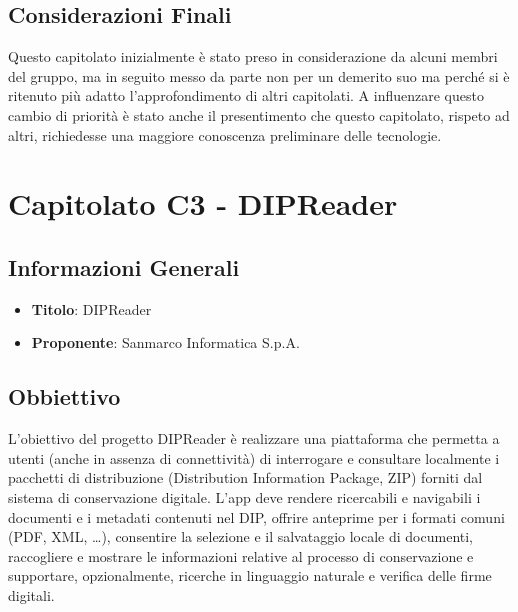 \documentclass[a4paper,12pt]{article}
\begin{document}
    \subsection{Considerazioni Finali}
    Questo capitolato inizialmente è stato preso in considerazione da alcuni membri del gruppo, ma in seguito messo da parte non per un demerito suo ma perché si è ritenuto più adatto l'approfondimento di altri capitolati. A influenzare questo cambio di priorità è stato anche il presentimento che questo capitolato, rispeto ad altri, richiedesse una maggiore conoscenza preliminare delle tecnologie.

    \section{Capitolato C3 - DIPReader} \label{sec:C3}
    \subsection{Informazioni Generali}
        \begin{itemize}
            \item \textbf{Titolo}: DIPReader
            \item \textbf{Proponente}: Sanmarco Informatica S.p.A.
        \end{itemize}
    \subsection{Obbiettivo}
    L’obiettivo del progetto DIPReader è realizzare una piattaforma che permetta a utenti (anche in assenza di connettività) di interrogare e consultare localmente i pacchetti di distribuzione (Distribution Information Package, ZIP) forniti dal sistema di conservazione digitale. L’app deve rendere ricercabili e navigabili i documenti e i metadati contenuti nel DIP, offrire anteprime per i formati comuni (PDF, XML, …), consentire la selezione e il salvataggio locale di documenti, raccogliere e mostrare le informazioni relative al processo di conservazione e supportare, opzionalmente, ricerche in linguaggio naturale e verifica delle firme digitali.
\end{document}
